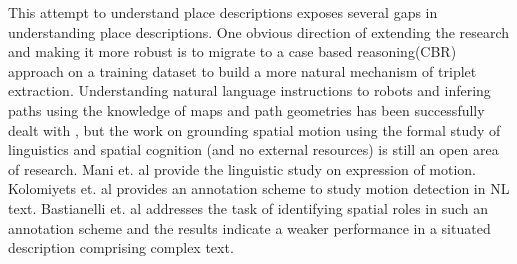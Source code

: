 \documentclass{acm_proc_article-sp}
\begin{document}
This attempt to understand place descriptions exposes several gaps in understanding place descriptions. One obvious direction of extending the research and making it more robust is to migrate to a case based reasoning(CBR) approach on a training dataset to build a more natural mechanism of triplet extraction. Understanding natural language instructions to robots and infering paths using the knowledge of maps and path geometries has been successfully dealt with \cite{kollar:robotic}, but the work on grounding spatial motion using the formal study of linguistics and spatial cognition (and no external resources) is still an open area of research. Mani et. al \cite{mani:motion} provide the linguistic study on expression of motion. Kolomiyets et. al \cite{kolomiyets:semeval} provides an annotation scheme to study motion detection in NL text. Bastianelli et. al \cite{bastianelli:unitor} addresses the task of identifying spatial roles in such an annotation scheme and the results indicate a weaker performance in a situated description comprising complex text.
\end{document}
